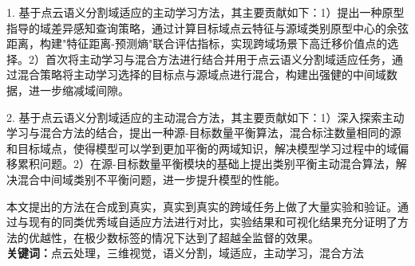 
1. 基于点云语义分割域适应的主动学习方法，其主要贡献如下：1）提出一种原型指导的域差异感知查询策略，通过计算目标域点云特征与源域类别原型中心的余弦距离，构建"特征距离-预测熵"联合评估指标，实现跨域场景下高迁移价值点的选择。2）首次将主动学习与混合方法进行结合并用于点云语义分割域适应任务，通过混合策略将主动学习选择的目标点与源域点进行混合，构建出强健的中间域数据，进一步缩减域间隙。

2. 基于点云语义分割域适应的主动混合方法，其主要贡献如下：1）深入探索主动学习与混合方法的结合，提出一种源-目标数量平衡算法，混合标注数量相同的源和目标域点，使得模型可以学到更加平衡的两域知识，解决模型学习过程中的域偏移累积问题。2）在源-目标数量平衡模块的基础上提出类别平衡主动混合算法，解决混合中间域类别不平衡问题，进一步提升模型的性能。

本文提出的方法在合成到真实，真实到真实的跨域任务上做了大量实验和验证。通过与现有的同类优秀域自适应方法进行对比，实验结果和可视化结果充分证明了方法的优越性，在极少数标签的情况下达到了超越全监督的效果。\\

\noindent\songti\textbf{关键词：}点云处理，三维视觉，语义分割，域适应，主动学习，混合方法

\clearpage